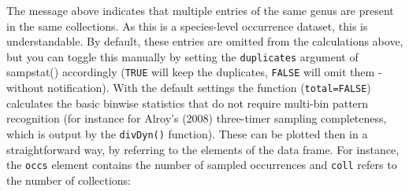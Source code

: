 \documentclass[]{article}
\newenvironment{Shaded}{\begin{snugshade}}{\end{snugshade}}
\newcommand{\KeywordTok}[1]{\textcolor[rgb]{0.13,0.29,0.53}{\textbf{{#1}}}}
\newcommand{\DataTypeTok}[1]{\textcolor[rgb]{0.13,0.29,0.53}{{#1}}}
\newcommand{\DecValTok}[1]{\textcolor[rgb]{0.00,0.00,0.81}{{#1}}}
\newcommand{\StringTok}[1]{\textcolor[rgb]{0.31,0.60,0.02}{{#1}}}
\newcommand{\CommentTok}[1]{\textcolor[rgb]{0.56,0.35,0.01}{\textit{{#1}}}}
\newcommand{\NormalTok}[1]{{#1}}
\begin{document}
The message above indicates that multiple entries of the same genus are
present in the same collections. As this is a species-level occurrence
dataset, this is understandable. By default, these entries are omitted
from the calculations above, but you can toggle this manually by setting
the \texttt{duplicates} argument of sampstat() accordingly
(\texttt{TRUE} will keep the duplicates, \texttt{FALSE} will omit them -
without notification). With the default settings the function
(\texttt{total=FALSE}) calculates the basic binwise statistics that do
not require multi-bin pattern recognition (for instance for Alroy's
(2008) three-timer sampling completeness, which is output by the
\texttt{divDyn()} function). These can be plotted then in a
straightforward way, by referring to the elements of the data frame. For
instance, the \texttt{occs} element contains the number of sampled
occurrences and \texttt{coll} refers to the number of collections:

\begin{Shaded}
\end{Shaded}
\end{document}
